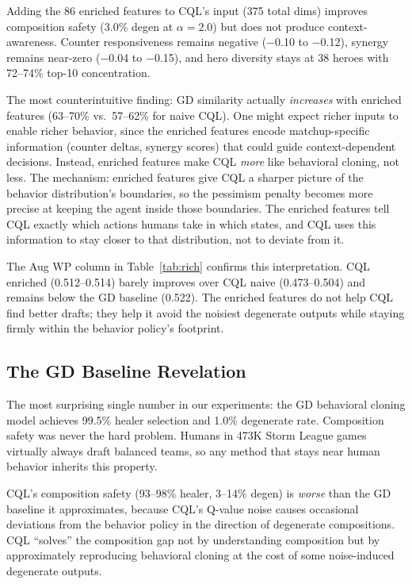 \documentclass[journal]{IEEEtran}
\begin{document}
Adding the 86 enriched features to CQL's input (375 total dims) improves composition safety (3.0\% degen at $\alpha = 2.0$) but does not produce context-awareness. Counter responsiveness remains negative ($-$0.10 to $-$0.12), synergy remains near-zero ($-$0.04 to $-$0.15), and hero diversity stays at 38 heroes with 72--74\% top-10 concentration.

The most counterintuitive finding: GD similarity actually \textit{increases} with enriched features (63--70\% vs.\ 57--62\% for naive CQL). One might expect richer inputs to enable richer behavior, since the enriched features encode matchup-specific information (counter deltas, synergy scores) that could guide context-dependent decisions. Instead, enriched features make CQL \textit{more} like behavioral cloning, not less. The mechanism: enriched features give CQL a sharper picture of the behavior distribution's boundaries, so the pessimism penalty becomes more precise at keeping the agent inside those boundaries. The enriched features tell CQL exactly which actions humans take in which states, and CQL uses this information to stay closer to that distribution, not to deviate from it.

The Aug WP column in Table~\ref{tab:rich} confirms this interpretation. CQL enriched (0.512--0.514) barely improves over CQL naive (0.473--0.504) and remains below the GD baseline (0.522). The enriched features do not help CQL find better drafts; they help it avoid the noisiest degenerate outputs while staying firmly within the behavior policy's footprint.

\subsection{The GD Baseline Revelation}

The most surprising single number in our experiments: the GD behavioral cloning model achieves 99.5\% healer selection and 1.0\% degenerate rate. Composition safety was never the hard problem. Humans in 473K Storm League games virtually always draft balanced teams, so any method that stays near human behavior inherits this property.

CQL's composition safety (93--98\% healer, 3--14\% degen) is \textit{worse} than the GD baseline it approximates, because CQL's Q-value noise causes occasional deviations from the behavior policy in the direction of degenerate compositions. CQL ``solves'' the composition gap not by understanding composition but by approximately reproducing behavioral cloning at the cost of some noise-induced degenerate outputs.
\end{document}
